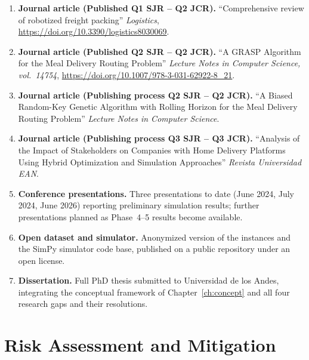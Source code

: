 \documentclass[12pt,a4paper]{report}
\begin{document}
\begin{enumerate}[label=\textbf{A\arabic*.}]
    \item \textbf{Journal article (Published Q1 SJR -- Q2 JCR).} ``Comprehensive review of robotized freight packing'' \emph{Logistics}, \url{https://doi.org/10.3390/logistics8030069}.

    \item \textbf{Journal article (Published Q2 SJR -- Q2 JCR).} ``A GRASP Algorithm for the Meal Delivery Routing Problem'' \emph{Lecture Notes in Computer Science, vol.\ 14754}, \url{https://doi.org/10.1007/978-3-031-62922-8_21}.

    \item \textbf{Journal article (Publishing process Q2 SJR -- Q2 JCR).} ``A Biased Random-Key Genetic Algorithm with Rolling Horizon for the Meal Delivery Routing Problem''  \emph{Lecture Notes in Computer Science}.

    \item \textbf{Journal article (Publishing process Q3 SJR -- Q3 JCR).} ``Analysis of the Impact of Stakeholders on Companies with Home Delivery Platforms Using Hybrid Optimization and Simulation Approaches'' \emph{Revista Universidad EAN}.

    \item \textbf{Conference presentations.} Three presentations to date (June 2024, July 2024, June 2026) reporting preliminary simulation results; further presentations planned as Phase~4--5 results become available.

    \item \textbf{Open dataset and simulator.} Anonymized version of the instances and the SimPy simulator code base, published on a public repository under an open license.

    \item \textbf{Dissertation.} Full PhD thesis submitted to Universidad de los Andes, integrating the conceptual framework of Chapter~\ref{ch:concept} and all four research gaps and their resolutions.
\end{enumerate}


\section{Risk Assessment and Mitigation}
\end{document}
